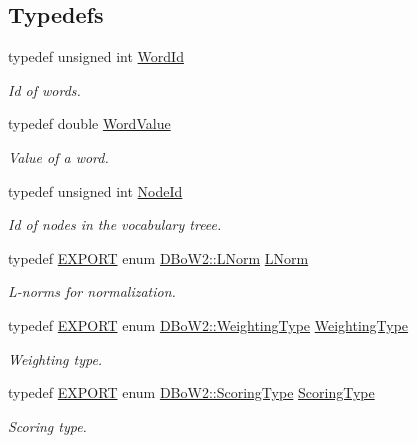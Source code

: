 \subsection*{Typedefs}
\begin{DoxyCompactItemize}
\item 
typedef unsigned int \mbox{\hyperlink{namespace_d_bo_w2_ab1a0d3283b2d4690a383372ed20bfeb5}{Word\+Id}}
\begin{DoxyCompactList}\small\item\em Id of words. \end{DoxyCompactList}\item 
typedef double \mbox{\hyperlink{namespace_d_bo_w2_a55fcd7333e591a38e96b91f41bc182f6}{Word\+Value}}
\begin{DoxyCompactList}\small\item\em Value of a word. \end{DoxyCompactList}\item 
typedef unsigned int \mbox{\hyperlink{namespace_d_bo_w2_a3a0fa9c50c0df508759362d6204566f2}{Node\+Id}}
\begin{DoxyCompactList}\small\item\em Id of nodes in the vocabulary treee. \end{DoxyCompactList}\item 
typedef \mbox{\hyperlink{config_8h_a3472d8cdbb788d5f1815b3522595bc49}{E\+X\+P\+O\+RT}} enum \mbox{\hyperlink{namespace_d_bo_w2_a53e9e0bcfc25c861815e413a7cf3fa51}{D\+Bo\+W2\+::\+L\+Norm}} \mbox{\hyperlink{namespace_d_bo_w2_a350a8bb9e38231cbf68ef07399d7a0c8}{L\+Norm}}
\begin{DoxyCompactList}\small\item\em L-\/norms for normalization. \end{DoxyCompactList}\item 
typedef \mbox{\hyperlink{config_8h_a3472d8cdbb788d5f1815b3522595bc49}{E\+X\+P\+O\+RT}} enum \mbox{\hyperlink{namespace_d_bo_w2_a5de5c8a307aca9a84ffefda2a9bc467a}{D\+Bo\+W2\+::\+Weighting\+Type}} \mbox{\hyperlink{namespace_d_bo_w2_a66be5c3cd2567ff15eeaf56fd55fffcc}{Weighting\+Type}}
\begin{DoxyCompactList}\small\item\em Weighting type. \end{DoxyCompactList}\item 
typedef \mbox{\hyperlink{config_8h_a3472d8cdbb788d5f1815b3522595bc49}{E\+X\+P\+O\+RT}} enum \mbox{\hyperlink{namespace_d_bo_w2_aa252a592dd607c6e60dede06ceef2722}{D\+Bo\+W2\+::\+Scoring\+Type}} \mbox{\hyperlink{namespace_d_bo_w2_ad047d6578eacc8aaae7d9cbcd3ded537}{Scoring\+Type}}
\begin{DoxyCompactList}\small\item\em Scoring type. \end{DoxyCompactList}\end{DoxyCompactItemize}

